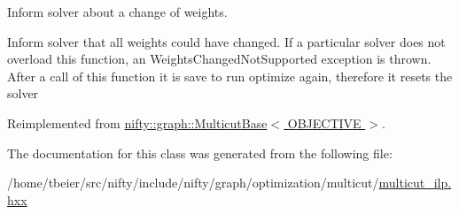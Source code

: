 Inform solver about a change of weights. 

Inform solver that all weights could have changed. If a particular solver does not overload this function, an Weights\+Changed\+Not\+Supported exception is thrown. After a call of this function it is save to run optimize again, therefore it resets the solver 

Reimplemented from \hyperlink{classnifty_1_1graph_1_1MulticutBase_a4c7a44afdc661993b3252dba62b5386f}{nifty\+::graph\+::\+Multicut\+Base$<$ O\+B\+J\+E\+C\+T\+I\+V\+E $>$}.



The documentation for this class was generated from the following file\+:\begin{DoxyCompactItemize}
\item 
/home/tbeier/src/nifty/include/nifty/graph/optimization/multicut/\hyperlink{multicut__ilp_8hxx}{multicut\+\_\+ilp.\+hxx}\end{DoxyCompactItemize}
